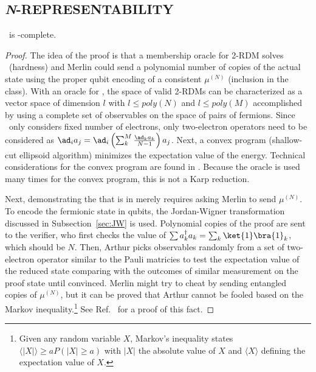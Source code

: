 \documentclass[11pt,oneside,final]{huthesis}%
\begin{document}
\subsection{\textit{N}-REPRESENTABILITY}
\begin{theorem}\REP~is \qma-complete.\end{theorem}
\begin{proof}
The idea of the proof is that a membership oracle for 2-RDM solves \FLH~(hardness) and Merlin could send a polynomial number of copies of the actual state using the proper qubit encoding of a consistent $\mu^{(N)}$ (inclusion in the class).  With an oracle for \REP, the space of valid 2-RDMs can be characterized as a vector space of dimension $l$ with $l \leq poly (N)$ and $l \leq poly(M)$ accomplished by using a complete set of observables on the space of pairs of fermions. Since \REP~only considers fixed number of electrons, only two-electron operators need to be considered as $\ad_ia_j=\ad_i\left( \sum_k^M\frac{\ad_ka_k}{N-1} \right)a_j$. %
Next, a convex program (shallow-cut ellipsoid algorithm) minimizes the expectation value of the energy.  Technical considerations for the convex program are found in \cite{Lui07}. Because the oracle is used many times for the convex program, this is not a Karp reduction.

Next, demonstrating the that \REP\; is in \qma\; merely requires asking Merlin to send $\mu^{(N)}$.  To encode the fermionic state in qubits, the Jordan-Wigner transformation discussed in Subsection~\ref{sec:JW} is used.  Polynomial copies of the proof are sent to the verifier, who first checks the value of $\sum a_k^{\dagger}a_k=\sum_k \ket{1}\bra{1}_k$, which should be $N$.  Then, Arthur picks observables randomly from a set of two-electron operator similar to the Pauli matricies to test the expectation value of the reduced state comparing with the outcomes of similar measurement on the proof state until convinced.  Merlin might try to cheat by sending entangled copies of $\mu^{(N)}$, but it can be proved that Arthur cannot be fooled based on the Markov inequality.\footnote{Given any random variable $X$, Markov's inequality states $\langle |X|\rangle\geq aP(|X|\geq a)$ with $|X|$ the absolute value of $X$ and $\langle X\rangle$ defining the expectation value of $X$.}  See Ref.~\cite{Aharonov03} for a proof of this fact. 
\end{proof}
\end{document}
